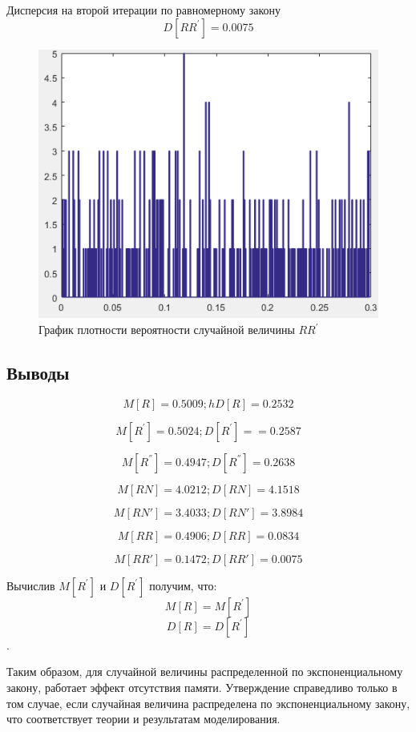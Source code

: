 Дисперсия на второй итерации по равномерному закону \[ D[RR^{'}]=0.0075 \]
\begin{figure}[h]
	\centering
	\includegraphics[width=0.4\linewidth]{img/kich_bur/image7.png} 
	\caption{График плотности вероятности случайной величины $RR^{'}$}
	\label{fig:img7}
\end{figure}

\subsection{Выводы}

\[ M[R]= 0.5009;h D[R]= 0.2532  \]


\[ M[R^{'}]= 0.5024; D[R^{'}]= = 0.2587 \]


\[ M[R^{''}]= 0.4947; D[R^{''}]= 0.2638 \]


\[ M[RN]= 4.0212; D[RN]=4.1518 \]


\[ M[RN']= 3.4033; D[RN']= 3.8984 \]


\[ M[RR]= 0.4906; D[RR]= 0.0834 \]


\[ M[RR']= 0.1472; D[RR']= 0.0075 \]

Вычислив $M[R^{'}]$ и $D[R^{'}]$ получим,
что: 
\[ M[R]=M[R^{'}]\]
\[D[R]=D[R^{'}] \]. 

Таким образом, для случайной величины распределенной по экспоненциальному
закону, работает эффект отсутствия памяти. Утверждение справедливо
только в том случае, если случайная величина распределена по экспоненциальному
закону, что соответствует теории и результатам моделирования. 

%
\newpage